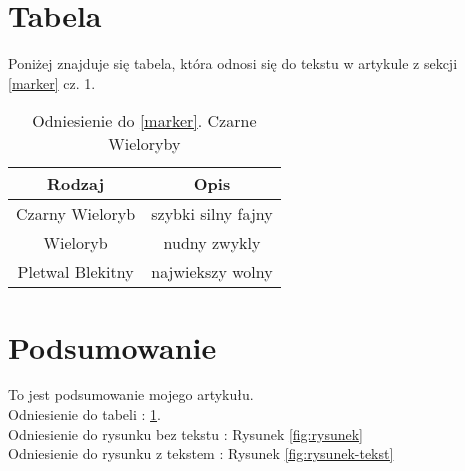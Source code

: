 \documentclass{article}
\begin{document}
\newpage
\section{Tabela}

Poniżej znajduje się tabela, która odnosi się do tekstu w artykule z sekcji \ref{marker} cz. 1.

\begin{table}[h]
  \centering
  \begin{tabular}{|c|c|}
    \hline
    \textbf{Rodzaj} & \textbf{Opis} \\
    \hline
    Czarny Wieloryb & szybki silny fajny \\
    Wieloryb & nudny zwykly \\
    Pletwal Blekitny & najwiekszy wolny \\
    \hline
  \end{tabular}
  \caption{Odniesienie do \ref{marker}. Czarne Wieloryby}
  \label{tab:odniesienie}
\end{table}

\section{Podsumowanie}

To jest podsumowanie mojego artykułu. \\
Odniesienie do tabeli : \ref{tab:odniesienie}.\\
Odniesienie do rysunku bez tekstu : Rysunek \ref{fig:rysunek}\\
Odniesienie do rysunku z tekstem : Rysunek \ref{fig:rysunek-tekst}\\


\end{document}
